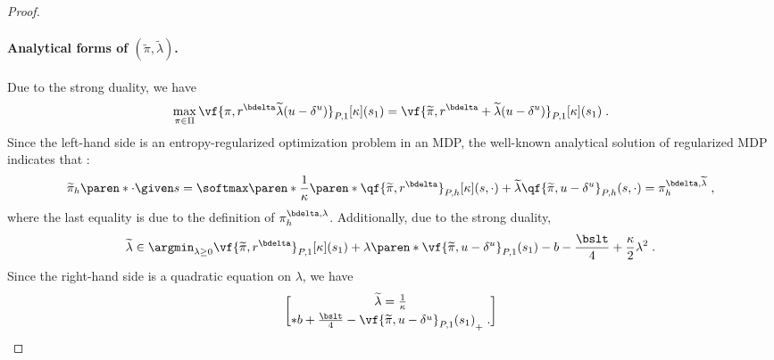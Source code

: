 \begin{proof}
\paragraph{Analytical forms of $(\widetilde{\pi}, \widetilde{\lambda})$.}
Due to the strong duality, we have
\begin{align*}
\max_{\pi \in \Pi} \vf{\pi, r^\bdelta \widetilde{\lambda} (u - \delta^u)}_{P, 1}[\kappa](s_1)
= \vf{\widetilde{\pi}, r^\bdelta + \widetilde{\lambda}(u - \delta^u)}_{P, 1}[\kappa](s_1)\;.
\end{align*}
Since the left-hand side is an entropy-regularized optimization problem in an MDP, the well-known analytical solution of regularized MDP indicates that \citep{geist2019theory}:
\begin{align}\label{eq:pilambda-analytical}
\widetilde{\pi}_{h}\paren*{\cdot \given s} = \softmax\paren*{\frac{1}{\kappa}\paren*{
\qf{\widetilde{\pi}, r^\bdelta}_{P, h}[\kappa](s, \cdot) + \widetilde{\lambda} \qf{\widetilde{\pi}, u - \delta^u}_{P, h}(s, \cdot)}}
=\pi^{\bdelta, \widetilde{\lambda}}_h\;, 
\end{align}
where the last equality is due to the definition of $\pi^{\bdelta, \lambda}_h$.
Additionally, due to the strong duality,
\begin{align*}
\widetilde{\lambda} \in \argmin_{\lambda \geq 0}\vf{\widetilde{\pi}, r^\bdelta}_{P, 1}[\kappa](s_1)  + \lambda \paren*{\vf{\widetilde{\pi}, u - \delta^u}_{P, 1}(s_1) - b - \frac{\bslt}{4}} + \frac{\kappa}{2} \lambda^2 \;.
\end{align*}
Since the right-hand side is a quadratic equation on $\lambda$, we have
\begin{align}
\widetilde{\lambda} = \frac{1}{\kappa} \brack*{b + \frac{\bslt}{4} - \vf{\widetilde{\pi}, u - \delta^u}_{P, 1}(s_1)}_+\;. \label{eq:lambda-analytical}
\end{align}


\end{proof}
